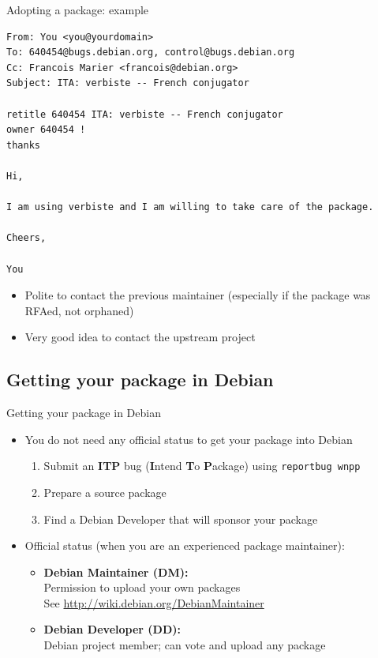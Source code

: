 \documentclass[10pt,final]{beamer}
\begin{document}
\begin{frame}[fragile=singleslide]{Adopting a package: example}
\begin{lstlisting}[basicstyle=\ttfamily\footnotesize]
From: You <you@yourdomain>
To: 640454@bugs.debian.org, control@bugs.debian.org
Cc: Francois Marier <francois@debian.org>
Subject: ITA: verbiste -- French conjugator

retitle 640454 ITA: verbiste -- French conjugator
owner 640454 !
thanks

Hi,

I am using verbiste and I am willing to take care of the package.

Cheers,

You
\end{lstlisting}

\begin{itemize}
\item Polite to contact the previous maintainer (especially if the package was RFAed, not orphaned)
\item Very good idea to contact the upstream project
\end{itemize}
\end{frame}

\subsection{Getting your package in Debian}
\begin{frame}{Getting your package in Debian}
\begin{itemize}
\item You do not need any official status to get your package into Debian
	\begin{enumerate}
		\item Submit an \textbf{ITP} bug (\textbf{I}ntend \textbf{T}o \textbf{P}ackage) using \texttt{reportbug wnpp}
			\hbr
		\item Prepare a source package
			\hbr
		\item Find a Debian Developer that will sponsor your package
	\end{enumerate}
\br
\item Official status (when you are an experienced package maintainer):
	\begin{itemize}
		\item \textbf{Debian Maintainer (DM):}\\
			Permission to upload your own packages\\
			See \url{http://wiki.debian.org/DebianMaintainer}
			\hbr
		\item \textbf{Debian Developer (DD):}\\
			Debian project member; can vote and upload any package
	\end{itemize}
\end{itemize}
\end{frame}
\end{document}
